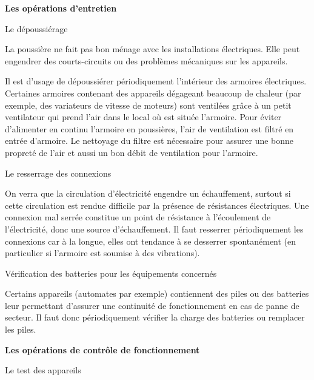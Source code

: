\vspace{0.3cm}
\textbf{Les opérations d’entretien}
\vspace{0.3cm}

Le dépoussiérage
\vspace{0.3cm}

La poussière ne fait pas bon ménage avec les installations électriques. Elle peut engendrer des courts-circuits ou des problèmes mécaniques sur les appareils.
\vspace{0.3cm}

Il est d’usage de dépoussiérer périodiquement l’intérieur des armoires électriques. Certaines armoires contenant des appareils dégageant beaucoup de chaleur (par exemple, des variateurs de vitesse de moteurs) sont ventilées grâce à un petit ventilateur qui prend l’air dans le local où est située l’armoire. Pour éviter d’alimenter en continu l’armoire en poussières, l’air de ventilation est filtré en entrée d’armoire. Le nettoyage du filtre est nécessaire pour assurer une bonne propreté de l’air et aussi un bon débit de ventilation pour l’armoire.

\vspace{0.3cm}
Le resserrage des connexions
\vspace{0.3cm}

On verra que la circulation d’électricité engendre un échauffement, surtout si cette circulation est rendue difficile par la présence de résistances électriques.
Une connexion mal serrée constitue un point de résistance à l’écoulement de l’électricité, donc une source d’échauffement. Il faut resserrer périodiquement les connexions car à la longue, elles ont tendance à se desserrer spontanément (en particulier si l’armoire est soumise à des vibrations).

\vspace{0.3cm}
Vérification des batteries pour les équipements concernés
\vspace{0.3cm}

Certains appareils (automates par exemple) contiennent des piles ou des batteries leur permettant d’assurer une continuité de fonctionnement en cas de panne de secteur.
Il faut donc périodiquement vérifier la charge des batteries ou remplacer les piles.


\vspace{0.3cm}
\textbf{Les opérations de contrôle de fonctionnement}
\vspace{0.3cm}

Le test des appareils
\vspace{0.3cm}

